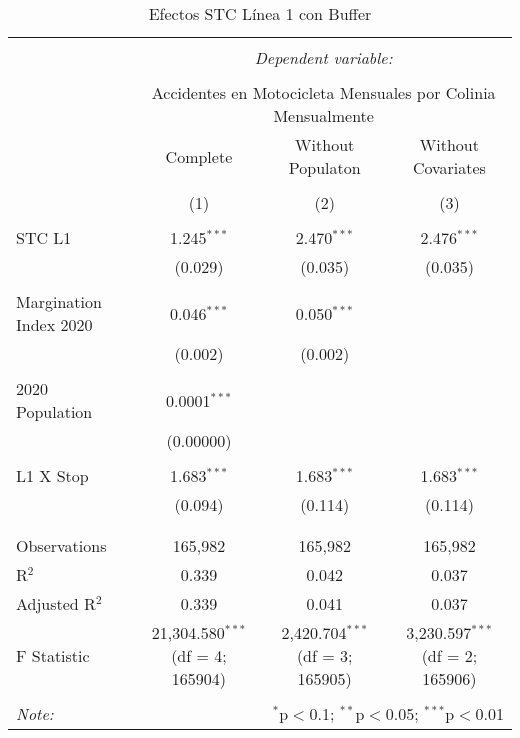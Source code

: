 
\begin{table}[!htbp] \centering 
  \caption{Efectos STC Línea 1 con Buffer} 
  \label{} 
\begin{tabular}{@{\extracolsep{5pt}}lccc} 
\\[-1.8ex]\hline 
\hline \\[-1.8ex] 
 & \multicolumn{3}{c}{\textit{Dependent variable:}} \\ 
\cline{2-4} 
\\[-1.8ex] & \multicolumn{3}{c}{Accidentes en Motocicleta Mensuales por Colinia Mensualmente} \\ 
 & Complete & Without Populaton & Without Covariates \\ 
\\[-1.8ex] & (1) & (2) & (3)\\ 
\hline \\[-1.8ex] 
 STC L1 & 1.245$^{***}$ & 2.470$^{***}$ & 2.476$^{***}$ \\ 
  & (0.029) & (0.035) & (0.035) \\ 
  & & & \\ 
 Margination Index 2020 & 0.046$^{***}$ & 0.050$^{***}$ &  \\ 
  & (0.002) & (0.002) &  \\ 
  & & & \\ 
 2020 Population & 0.0001$^{***}$ &  &  \\ 
  & (0.00000) &  &  \\ 
  & & & \\ 
 L1 X Stop & 1.683$^{***}$ & 1.683$^{***}$ & 1.683$^{***}$ \\ 
  & (0.094) & (0.114) & (0.114) \\ 
  & & & \\ 
\hline \\[-1.8ex] 
Observations & 165,982 & 165,982 & 165,982 \\ 
R$^{2}$ & 0.339 & 0.042 & 0.037 \\ 
Adjusted R$^{2}$ & 0.339 & 0.041 & 0.037 \\ 
F Statistic & 21,304.580$^{***}$ (df = 4; 165904) & 2,420.704$^{***}$ (df = 3; 165905) & 3,230.597$^{***}$ (df = 2; 165906) \\ 
\hline 
\hline \\[-1.8ex] 
\textit{Note:}  & \multicolumn{3}{r}{$^{*}$p$<$0.1; $^{**}$p$<$0.05; $^{***}$p$<$0.01} \\ 
\end{tabular} 
\end{table} 
